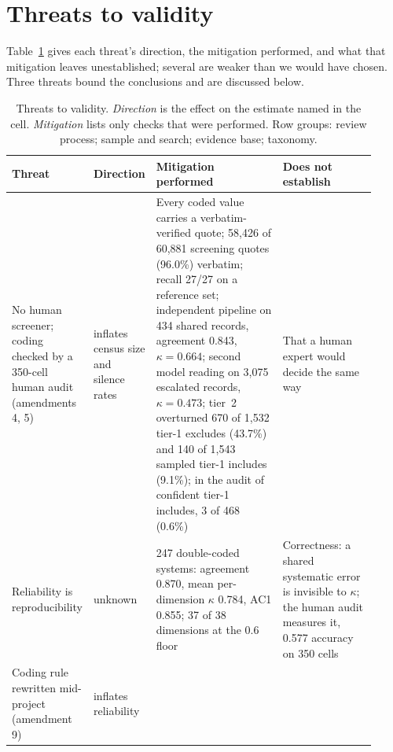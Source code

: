 \section{Threats to validity}
\label{sec:threats}
\label{subsec:rule5}\label{subsec:loop}\label{subsec:weights}\label{subsec:benchmarks}
\label{subsec:ourablation}\label{subsec:searchbias}\label{subsec:searchfreeze}\label{subsec:lessons}

Table~\ref{tab:threats} gives each threat's direction, the mitigation performed, and what
that mitigation leaves unestablished; several are weaker than we would have chosen. Three threats bound
the conclusions and are discussed below.

\begin{table}[tp]
\caption{Threats to validity. \emph{Direction} is the effect on the estimate named in the cell.
\emph{Mitigation} lists only checks that were performed. Row groups: review process; sample and search;
evidence base; taxonomy.}
\label{tab:threats}
\footnotesize
\begin{tabular}{@{}p{0.17\linewidth}p{0.10\linewidth}p{0.38\linewidth}p{0.27\linewidth}@{}}
\toprule
Threat & Direction & Mitigation performed & Does not establish \\
\midrule
\raggedright No human screener; coding checked by a 350-cell human audit (amendments 4, 5) & \raggedright inflates census size and silence rates &
\raggedright Every coded value carries a verbatim-verified quote; 58,426 of 60,881 screening quotes (96.0\%)
verbatim; recall 27/27 on a reference set; independent pipeline on 434 shared records, agreement 0.843,
$\kappa = 0.664$; second model reading on 3,075 escalated records, $\kappa = 0.473$; tier~2 overturned 670 of 1,532
tier-1 excludes (43.7\%) and 140 of 1,543 sampled tier-1 includes (9.1\%); in the audit of confident
tier-1 includes, 3 of 468 (0.6\%) &
\raggedright That a human expert would decide the same way \tabularnewline
\addlinespace[2pt]
\raggedright Reliability is reproducibility & \raggedright unknown &
\raggedright 247 double-coded systems: agreement 0.870, mean per-dimension $\kappa$ 0.784, AC1 0.855; 37 of 38
dimensions at the 0.6 floor &
\raggedright Correctness: a shared systematic error is invisible to $\kappa$; the human audit measures it, 0.577 accuracy on 350 cells \tabularnewline
\addlinespace[2pt]
\raggedright Coding rule rewritten mid-project (amendment 9) & \raggedright inflates reliability &

\end{tabular}
\end{table}
